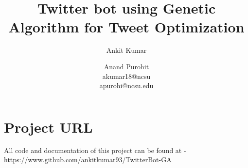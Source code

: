 \documentclass[letterpaper]{article}
\title{Twitter bot using Genetic Algorithm for Tweet Optimization}
\author{Ankit Kumar \and Anand Purohit\\
akumar18@ncsu \\ apurohi@ncsu.edu}
\begin{document}
\maketitle









\section{Project URL}
All code and documentation of this project can be found at - https://www.github.com/ankitkumar93/TwitterBot-GA



\end{document}
